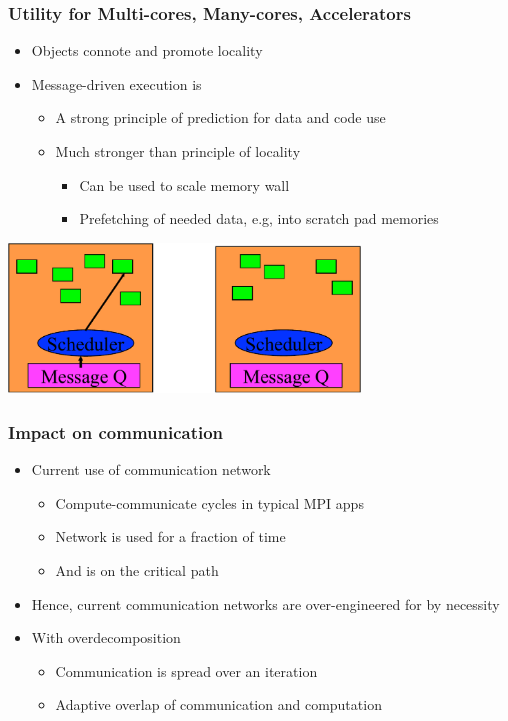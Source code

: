 \begin{frame}[t]
\frametitle{Utility for Multi-cores, Many-cores, Accelerators}
  \begin{itemize}
    \item Objects connote and promote locality
    \item Message-driven execution is
    \begin{itemize}
      \item A strong principle of prediction for data and code use
      \item Much stronger than principle of locality
      \begin{itemize}
        \item Can be used to scale memory wall
        \item Prefetching of needed data, e.g, into scratch pad memories
      \end{itemize}
    \end{itemize}
  \end{itemize}
  \begin{center} \includegraphics[width=0.7\textwidth]{figures/scheduler} \end{center}
\end{frame}

\begin{frame}[t]
\frametitle{Impact on communication}
  \begin{itemize}
    \item Current use of communication network
    \begin{itemize}
      \item Compute-communicate cycles in typical MPI apps
      \item Network is used for a fraction of time
      \item And is on the critical path
    \end{itemize}
    \pause
    \item Hence, current communication networks are over-engineered for by necessity
    \pause
    \item With overdecomposition
    \begin{itemize}
      \item Communication is spread over an iteration
      \item Adaptive overlap of communication and computation
    \end{itemize}
  \end{itemize}
\end{frame}


